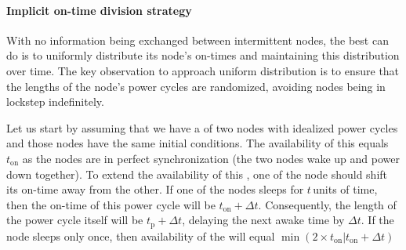 \paragraph{Implicit on-time division strategy} 
With no information being exchanged between intermittent nodes, the best \sys can do is to uniformly distribute its node's on-times and maintaining this distribution over time. 
The key observation to approach uniform distribution is to ensure that the lengths of the node's power cycles are randomized, avoiding nodes being in lockstep indefinitely.

Let us start by assuming that we have a \sys of two nodes with idealized power cycles and those nodes have the same initial conditions. The availability of this \sys equals $t_\text{on}$ as the nodes are in perfect synchronization (the two nodes wake up and power down together). 
To extend the availability of this \sys, one of the node should
shift its on-time away from the other. If one of the nodes sleeps for $t$\,units of time, then the on-time of this power cycle will be $t_\text{on}+\Delta t$. Consequently, the length of the power cycle itself will be $t_\text{p} + \Delta t $, delaying the next awake time by $\Delta t$.
If the node sleeps only once, then availability of the \sys will equal $\min \left(2\times t_\text{on}| t_\text{on}+\Delta t\right)$

